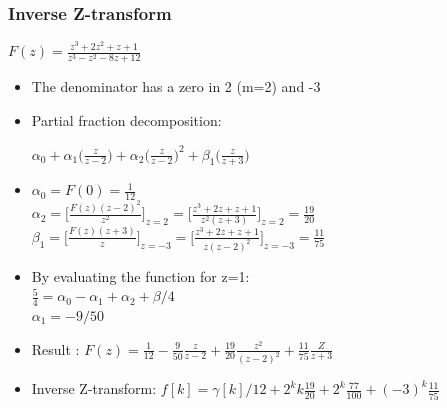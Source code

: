 \begin{frame}
	\frametitle{Inverse Z-transform}
	\begin{example}
		\begin{center}
			$F(z) = \frac{z^3 + 2 z^2 + z +1}{z^3-z^2-8z +12}$
		\end{center}
		\vspace{-1.5 em}
		\begin{itemize}
			\item The denominator has a zero in 2 (m=2) and -3
			\item Partial fraction decomposition:
			\begin{center}
				$\alpha_0 +\alpha_1 \bigg(\frac{z}{z-2}\bigg)+ \alpha_2 \bigg(\frac{z}{z-2}\bigg)^{2} + \beta_1 \bigg(\frac{z}{z+3}\bigg)$
			\end{center}
			
			\item \begin{center}
				$\alpha_0 = F(0) = \frac{1}{12} $ \\
				$\alpha_2 =\Bigg[\frac{F(z)(z-2)^{2}}{z^2}\Bigg]_{z=2} = \Bigg[\frac{z^3+2z+z+1}{z^2(z+3)}\Bigg]_{z=2} = \frac{19}{20}$\\
				$\beta_1 =\Bigg[\frac{F(z)(z+3)}{z}\Bigg]_{z=-3} = \Bigg[\frac{z^3+2z+z+1}{z(z-2)^2}\Bigg]_{z=-3} = \frac{11}{75}$ 
			\end{center}
		
		\end{itemize}
	\end{example}
\end{frame}
\begin{frame}
	\begin{example}
		\begin{itemize}
				\item By evaluating the function for z=1:\\
				$\frac{5}{4} = \alpha_0 - \alpha_1 + \alpha_2 + \beta/4$\\
				$\alpha_1 = -9/50$
				\item Result : $F(z) = \frac{1}{12} - \frac{9}{50} \frac{z}{z-2} + \frac{19}{20} \frac{z^2}{(z-2)^2} + \frac{11}{75} \frac{Z}{z+3}$
				\item Inverse Z-transform: $f[k] = \gamma[k]/12 + 2^k k \frac{19}{20}
				+ 2^k \frac{77}{100} + (-3)^k \frac{11}{75}$
		\end{itemize}
	\end{example}
\end{frame}
